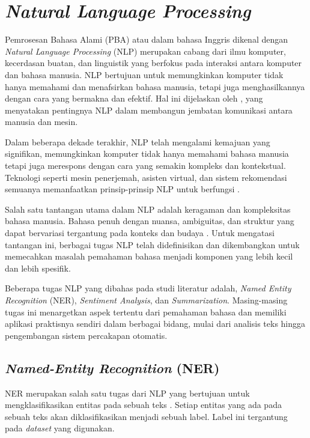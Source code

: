 \section{\textit{Natural Language Processing}}

Pemrosesan Bahasa Alami (PBA) atau dalam bahasa Inggris dikenal dengan \textit{Natural Language Processing} (NLP) merupakan cabang dari ilmu komputer, kecerdasan buatan, dan linguistik yang berfokus pada interaksi antara komputer dan bahasa manusia. NLP bertujuan untuk memungkinkan komputer tidak hanya memahami dan menafsirkan bahasa manusia, tetapi juga menghasilkannya dengan cara yang bermakna dan efektif. Hal ini dijelaskan oleh \citeauthor{nlp} \parencite{nlp}, yang menyatakan pentingnya NLP dalam membangun jembatan komunikasi antara manusia dan mesin.

Dalam beberapa dekade terakhir, NLP telah mengalami kemajuan yang signifikan, memungkinkan komputer tidak hanya memahami bahasa manusia tetapi juga merespons dengan cara yang semakin kompleks dan kontekstual. Teknologi seperti mesin penerjemah, asisten virtual, dan sistem rekomendasi semuanya memanfaatkan prinsip-prinsip NLP untuk berfungsi \parencite{nlp}.

Salah satu tantangan utama dalam NLP adalah keragaman dan kompleksitas bahasa manusia. Bahasa penuh dengan nuansa, ambiguitas, dan struktur yang dapat bervariasi tergantung pada konteks dan budaya \parencite{ai}. Untuk mengatasi tantangan ini, berbagai tugas NLP telah didefinisikan dan dikembangkan untuk memecahkan masalah pemahaman bahasa menjadi komponen yang lebih kecil dan lebih spesifik.

Beberapa tugas NLP yang dibahas pada studi literatur adalah, \textit{Named Entity Recognition} (NER), \textit{Sentiment Analysis}, dan \textit{Summarization}. Masing-masing tugas ini menargetkan aspek tertentu dari pemahaman bahasa dan memiliki aplikasi praktisnya sendiri dalam berbagai bidang, mulai dari analisis teks hingga pengembangan sistem percakapan otomatis.

\subsection{\textit{Named-Entity Recognition} (NER)}

NER merupakan salah satu tugas dari NLP yang bertujuan untuk mengklasifikasikan entitas pada sebuah teks \parencite{ner}. Setiap entitas yang ada pada sebuah teks akan diklasifikasikan menjadi sebuah label. Label ini tergantung pada \textit{dataset} yang digunakan.

